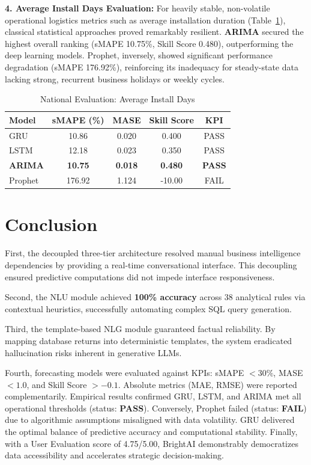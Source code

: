 \documentclass[conference]{IEEEtran}
\begin{document}
\textbf{4. Average Install Days Evaluation:} For heavily stable, non-volatile operational logistics metrics such as average installation duration (Table~\ref{tab:fc_install}), classical statistical approaches proved remarkably resilient. \textbf{ARIMA} secured the highest overall ranking (sMAPE 10.75\%, Skill Score 0.480), outperforming the deep learning models. Prophet, inversely, showed significant performance degradation (sMAPE 176.92\%), reinforcing its inadequacy for steady-state data lacking strong, recurrent business holidays or weekly cycles. 

\begin{table}[htbp] \footnotesize
\caption{National Evaluation: Average Install Days}
\begin{center}
\begin{tabular}{lcccc}
\toprule
\textbf{Model} & \textbf{sMAPE (\%)} & \textbf{MASE} & \textbf{Skill Score} & \textbf{KPI} \\
\midrule
GRU & 10.86 & 0.020 & 0.400 & PASS \\
LSTM & 12.18 & 0.023 & 0.350 & PASS \\
\textbf{ARIMA} & \textbf{10.75} & \textbf{0.018} & \textbf{0.480} & \textbf{PASS} \\
Prophet & 176.92 & 1.124 & -10.00 & FAIL \\
\bottomrule
\end{tabular}
\label{tab:fc_install}
\end{center}

\end{table}
\section{Conclusion}
First, the decoupled three-tier architecture resolved manual business intelligence dependencies by providing a real-time conversational interface. This decoupling ensured predictive computations did not impede interface responsiveness.

Second, the NLU module achieved \textbf{100\% accuracy} across 38 analytical rules via contextual heuristics, successfully automating complex SQL query generation.

Third, the template-based NLG module guaranteed factual reliability. By mapping database returns into deterministic templates, the system eradicated hallucination risks inherent in generative LLMs.

Fourth, forecasting models were evaluated against KPIs: sMAPE $<30\%$, MASE $<1.0$, and Skill Score $>-0.1$. Absolute metrics (MAE, RMSE) were reported complementarily. Empirical results confirmed GRU, LSTM, and ARIMA met all operational thresholds (status: \textbf{PASS}). Conversely, Prophet failed (status: \textbf{FAIL}) due to algorithmic assumptions misaligned with data volatility. GRU delivered the optimal balance of predictive accuracy and computational stability. Finally, with a User Evaluation score of 4.75/5.00, BrightAI demonstrably democratizes data accessibility and accelerates strategic decision-making.
\end{document}
